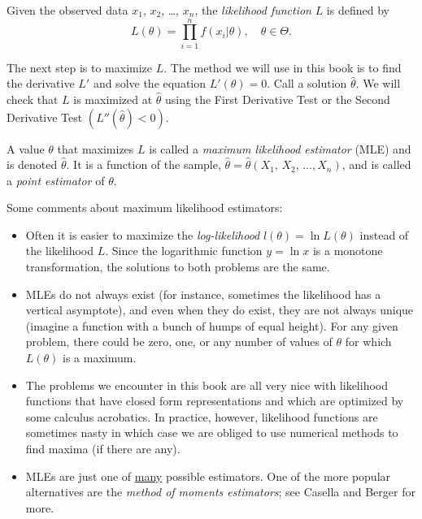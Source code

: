 \documentclass[captions=tableheading]{scrbook}
\begin{document}
\begin{defn}
Given the observed data \(x_{1}\), \(x_{2}\), \ldots{}, \(x_{n}\), the \emph{likelihood function} \(L\) is defined by 
\[ 
L(\theta)=\prod_{i=1}^{n}f(x_{i}|\theta),\quad\theta\in\Theta.
\]
\end{defn}

The next step is to maximize \(L\). The method we will use in this book is to find the derivative \(L'\) and solve the equation \(L'(\theta)=0\). Call a solution \(\hat{\theta}\). We will check that \(L\) is maximized at \(\hat{\theta}\) using the First Derivative Test or the Second Derivative Test \(\left(L''(\hat{\theta})<0\right)\).

\begin{defn}
A value \(\theta\) that maximizes \(L\) is called a \emph{maximum likelihood estimator} (MLE) and is denoted \(\hat{\theta}\). It is a function of the sample, \(\hat{\theta}=\hat{\theta}\left(X_{1},\, X_{2},\,\ldots,X_{n}\right)\), and is called a \emph{point estimator} of \(\theta\).
\end{defn}

\begin{rem}
Some comments about maximum likelihood estimators:
\begin{itemize}
\item Often it is easier to maximize the \emph{log-likelihood} \(l(\theta)=\ln L(\theta)\) instead of the likelihood \(L\). Since the logarithmic function \(y=\ln x\) is a monotone transformation, the solutions to both problems are the same.
\item MLEs do not always exist (for instance, sometimes the likelihood has a vertical asymptote), and even when they do exist, they are not always unique (imagine a function with a bunch of humps of equal height). For any given problem, there could be zero, one, or any number of values of \(\theta\) for which \(L(\theta)\) is a maximum.
\item The problems we encounter in this book are all very nice with likelihood functions that have closed form representations and which are optimized by some calculus acrobatics. In practice, however, likelihood functions are sometimes nasty in which case we are obliged to use numerical methods to find maxima (if there are any).
\item MLEs are just one of \underline{many} possible estimators. One of the more popular alternatives are the \emph{method of moments estimators}; see Casella and Berger \cite{Casella2002} for more.
\end{itemize}
\end{rem}
\end{document}
